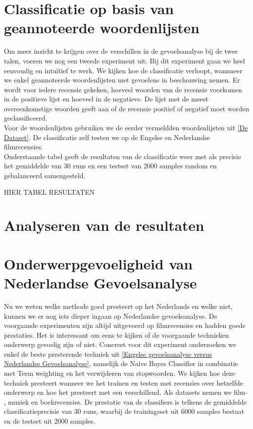 \section{Classificatie op basis van geannoteerde woordenlijsten}\label{Classificatie op basis van geannoteerde woordenlijsten}


Om meer inzicht te krijgen over de verschillen in de gevoelsanalyse bij de twee talen, voeren we nog een tweede experiment uit. Bij dit experiment gaan we heel eenvoudig en intu\"itief te werk. We kijken hoe de classificatie verloopt, wannneer we enkel geannoteerde woordenlijsten met gevoelens in beschouwing nemen. Er wordt voor iedere recensie gekeken, hoeveel woorden van de recensie voorkomen in de positieve lijst en hoeveel in de negatieve. De lijst met de meest overeenkomstige woorden geeft aan of de recensie positief of negatief moet worden geclassificeerd.\\
Voor de woordenlijsten gebruiken we de eerder vermeldden woordenlijsten uit \ref{De Dataset}. De classificatie zelf testen we op de Engelse en Nederlandse filmrecensies.\\
Onderstaande tabel geeft de resultaten van de classificatie weer met als precisie het gemiddelde van 30 runs en een testset van 2000 samples random en gebalanceerd samengesteld.

HIER TABEL RESULTATEN


\section{Analyseren van de resultaten}\label{Analyseren van de resultaten}

\section{Onderwerpgevoeligheid van Nederlandse Gevoelsanalyse}\label{Onderwerpgevoeligheid van Nederlandse Gevoelsanalyse}

Nu we weten welke methode goed presteert op het Nederlands en welke niet, kunnen we er nog iets dieper ingaan op Nederlandse gevoelsanalyse. De voorgaande experimenten zijn altijd uitgevoerd op filmrecensies en hadden goede prestaties. Het is interessant om eens te kijken of de voorgaande technieken onderwerp gevoelig zijn of niet. Concreet voor dit experiment onderzoeken we enkel de beste presterende techniek uit \ref{Engelse gevoelsanalyse versus Nederlandse Gevoelsanalyse}, namelijk de Naive Bayes Classifier in combinatie met Term weighting en het verwijderen van stopwoorden. We kijken hoe deze techniek presteert wanneer we het trainen en testen met recensies over hetzelfde onderwerp en hoe het presteert met een verschillend.  Als datasets nemen we film- , muziek en boekrecensies. De prestatie van de classifiers is telkens de gemiddelde classificatieprecisie van 30 runs, waarbij de trainingsset uit 6000 samples bestaat en de testset uit 2000 samples. 

